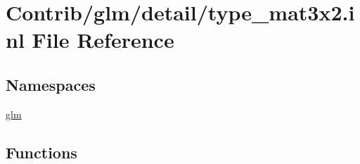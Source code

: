 \hypertarget{type__mat3x2_8inl}{}\section{Contrib/glm/detail/type\+\_\+mat3x2.inl File Reference}
\label{type__mat3x2_8inl}
\subsection*{Namespaces}
\begin{DoxyCompactItemize}
\item 
 \mbox{\hyperlink{namespaceglm}{glm}}
\end{DoxyCompactItemize}
\subsection*{Functions}
